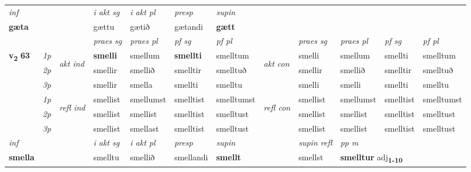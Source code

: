 \begin{longtable}[l]{X>{\footnotesize\itshape}llXXXXlXXXX}
   {\textit{inf}} & &  & \textit{i akt sg} & \textit{i akt pl}   & \textit{presp} & \textit{supin}   \\*
  {\textbf{gæta}} & && gættu  & gætið   & gætandi &  \textbf{gætt}   \\*

\midrule

 & &   & \textit{praes sg}  & \textit{praes pl}    & \textit{ pf sg} & \textit{pf pl} & & \textit{praes sg}  & \textit{praes pl}    & \textit{pf sg} & \textit{pf pl }  \\ \cmidrule{4-7} \cmidrule{9-12}
 \multirow{2}{*}{{{\textbf{v{\textsubscript{2}}} \Large{\textbf{63}}}}}  & 1p & \multirow{3}{*}{\begin{turn}{90}\textit{akt ind}\end{turn}} & \textbf{smelli} & smellum & \textbf{smellti} & smelltum & \multirow{3}{*}{\begin{turn}{90}\textit{akt con}\end{turn}} &smelli & smellum & smellti & smelltum\\*
 & 2p &  &  smellir  & smellið & smelltir & smelltuð & & smellir & smellið & smelltir & smelltuð \\*
 & 3p &  & smellir & smella & smellti & smelltu & & smelli & smelli& smellti & smelltu \\*
\cmidrule{4-7} \cmidrule{9-12}
 & 1p & \multirow{3}{*}{\begin{turn}{90}\textit{refl ind}\end{turn}}  & smellist & smellumst & smelltist & smelltumst & \multirow{3}{*}{\begin{turn}{90}\textit{refl con}\end{turn}}  &smellist & smellumst & smelltist & smelltumst \\*
 & 2p &  & smellist & smellist & smelltist & smelltust & &smellist & smellist & smelltist & smelltust \\*
 & 3p  & & smellist & smellast & smelltist & smelltust & & smellist & smellist& smelltist & smelltust \\*
\cmidrule{4-7} \cmidrule{9-12}

   {\textit{inf}} & &  & \textit{i akt sg} & \textit{i akt pl}   & \textit{presp} & \textit{supin} && \textit{supin refl} & \textit{pp m} \\*
  {\textbf{smella}} & && smelltu  & smellið   & smellandi &  \textbf{smellt} && smellst & \multicolumn{2}{l}{\textbf{smelltur} adj\textbf{\textsubscript{1-10}}} \\*


\end{longtable}
